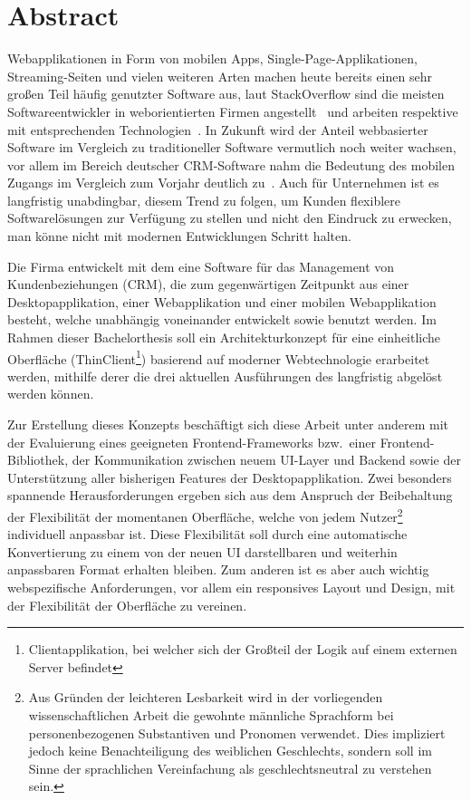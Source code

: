 \chapter{Abstract}

Webapplikationen in Form von mobilen Apps, Single-Page-Applikationen, Streaming-Seiten und vielen weiteren Arten machen heute bereits einen sehr großen Teil häufig genutzter Software aus, laut StackOverflow sind die meisten Softwareentwickler in weborientierten Firmen angestellt~\parencite{stackoverflow_survey_company_2018} und arbeiten respektive mit entsprechenden Technologien~\parencite{stackoverflow_survey_technologies_2018}.
In Zukunft wird der Anteil webbasierter Software im Vergleich zu traditioneller Software vermutlich noch weiter wachsen, vor allem im Bereich deutscher CRM-Software nahm die Bedeutung des mobilen Zugangs im Vergleich zum Vorjahr deutlich zu~\parencite[vgl.][]{bahr_capterra_2019}.
Auch für Unternehmen ist es langfristig unabdingbar, diesem Trend zu folgen, um Kunden flexiblere Softwarelösungen zur Verfügung zu stellen und nicht den Eindruck zu erwecken, man könne nicht mit modernen Entwicklungen Schritt halten.

Die Firma  entwickelt mit dem  eine Software für das Management von Kundenbeziehungen (\gls{CRM}), die zum gegenwärtigen Zeitpunkt aus einer Desktopapplikation, einer Webapplikation und einer mobilen Webapplikation besteht, welche unabhängig voneinander entwickelt sowie benutzt werden.
Im Rahmen dieser Bachelorthesis soll ein Architekturkonzept für eine einheitliche Oberfläche (ThinClient\footnote{Clientapplikation, bei welcher sich der Großteil der Logik auf einem externen Server befindet}) basierend auf moderner Webtechnologie erarbeitet werden, mithilfe derer die drei aktuellen Ausführungen des  langfristig abgelöst werden können.

Zur Erstellung dieses Konzepts beschäftigt sich diese Arbeit unter anderem mit der Evaluierung eines geeigneten Frontend-Frameworks bzw.\ einer Frontend-Bibliothek, der Kommunikation zwischen neuem UI-Layer und Backend sowie der Unterstützung aller bisherigen Features der Desktopapplikation.
Zwei besonders spannende Herausforderungen ergeben sich aus dem Anspruch der Beibehaltung der Flexibilität der momentanen Oberfläche, welche von jedem Nutzer\footnote{Aus Gründen der leichteren Lesbarkeit wird in der vorliegenden wissenschaftlichen Arbeit die gewohnte männliche Sprachform bei personenbezogenen Substantiven und Pronomen verwendet. Dies impliziert jedoch keine Benachteiligung des weiblichen Geschlechts, sondern soll im Sinne der sprachlichen Vereinfachung als geschlechtsneutral zu verstehen sein.} individuell anpassbar ist. Diese Flexibilität soll durch eine automatische Konvertierung zu einem von der neuen UI darstellbaren und weiterhin anpassbaren Format erhalten bleiben. Zum anderen ist es aber auch wichtig webspezifische Anforderungen, vor allem ein responsives Layout und Design, mit der Flexibilität der Oberfläche zu vereinen.
